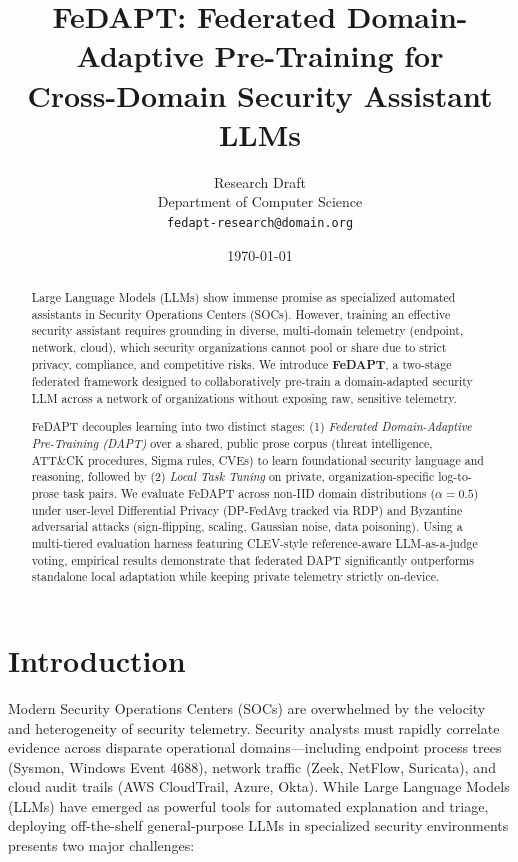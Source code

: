 \documentclass[11pt,a4paper]{article}
\title{FeDAPT: Federated Domain-Adaptive Pre-Training for\\Cross-Domain Security Assistant LLMs}
\author{Research Draft \\
  Department of Computer Science \\
  \texttt{fedapt-research@domain.org}}
\date{\today}
\begin{document}
\maketitle

\begin{abstract}
Large Language Models (LLMs) show immense promise as specialized automated assistants in Security Operations Centers (SOCs). However, training an effective security assistant requires grounding in diverse, multi-domain telemetry (endpoint, network, cloud), which security organizations cannot pool or share due to strict privacy, compliance, and competitive risks. We introduce \textbf{FeDAPT}, a two-stage federated framework designed to collaboratively pre-train a domain-adapted security LLM across a network of organizations without exposing raw, sensitive telemetry. 

FeDAPT decouples learning into two distinct stages: (1) \emph{Federated Domain-Adaptive Pre-Training (DAPT)} over a shared, public prose corpus (threat intelligence, ATT\&CK procedures, Sigma rules, CVEs) to learn foundational security language and reasoning, followed by (2) \emph{Local Task Tuning} on private, organization-specific log-to-prose task pairs. We evaluate FeDAPT across non-IID domain distributions ($\alpha = 0.5$) under user-level Differential Privacy (DP-FedAvg tracked via RDP) and Byzantine adversarial attacks (sign-flipping, scaling, Gaussian noise, data poisoning). Using a multi-tiered evaluation harness featuring CLEV-style reference-aware LLM-as-a-judge voting, empirical results demonstrate that federated DAPT significantly outperforms standalone local adaptation while keeping private telemetry strictly on-device.
\end{abstract}

\section{Introduction}

Modern Security Operations Centers (SOCs) are overwhelmed by the velocity and heterogeneity of security telemetry. Security analysts must rapidly correlate evidence across disparate operational domains—including endpoint process trees (Sysmon, Windows Event 4688), network traffic (Zeek, NetFlow, Suricata), and cloud audit trails (AWS CloudTrail, Azure, Okta). While Large Language Models (LLMs) have emerged as powerful tools for automated explanation and triage, deploying off-the-shelf general-purpose LLMs in specialized security environments presents two major challenges:
\end{document}
